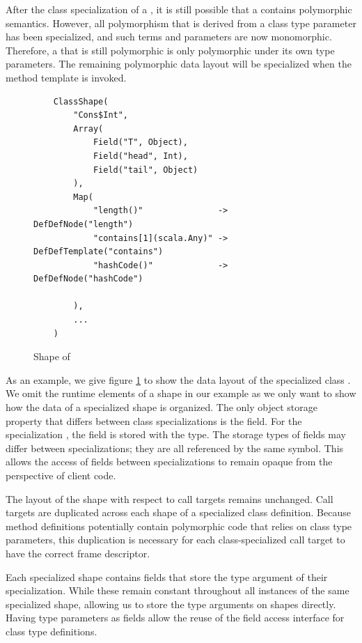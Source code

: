 After the class specialization of a , it is still possible that a  contains polymorphic semantics.
However, all polymorphism that is derived from a class type parameter has been specialized, and such terms and parameters are now monomorphic.
Therefore, a  that is still polymorphic is only polymorphic under its own type parameters.
The remaining polymorphic data layout will be specialized when the method template is invoked.

\begin{figure}[!htb]
	\begin{verbatim}
	ClassShape(
		"Cons$Int",
		Array(
			Field("T", Object),
			Field("head", Int),
			Field("tail", Object)
		),
		Map(
			"length()"               -> DefDefNode("length")
			"contains[1](scala.Any)" -> DefDefTemplate("contains")
			"hashCode()"             -> DefDefNode("hashCode")
		
		),
		...
	)
	\end{verbatim}
	\caption{Shape of }
	\label{shape:cons-int}
\end{figure}

As an example, we give figure \ref{shape:cons-int} to show the data layout of the specialized class .
We omit the runtime elements of a shape in our example as we only want to show how the data of a specialized shape is organized.
The only object storage property that differs between class specializations is the  field.
For the specialization , the  field is stored with the  type.
The storage types of fields may differ between specializations; they are all referenced by the same symbol.
This allows the access of fields between specializations to remain opaque from the perspective of client code.

The layout of the shape with respect to call targets remains unchanged.
Call targets are duplicated across each shape of a specialized class definition.
Because method definitions potentially contain polymorphic code that relies on class type parameters, this duplication is necessary for each class-specialized call target to have the correct frame descriptor.

Each specialized shape contains fields that store the type argument of their specialization.
While these remain constant throughout all instances of the same specialized shape, allowing us to store the type arguments on shapes directly.
Having type parameters as fields allow the reuse of the field access interface for class type definitions.
